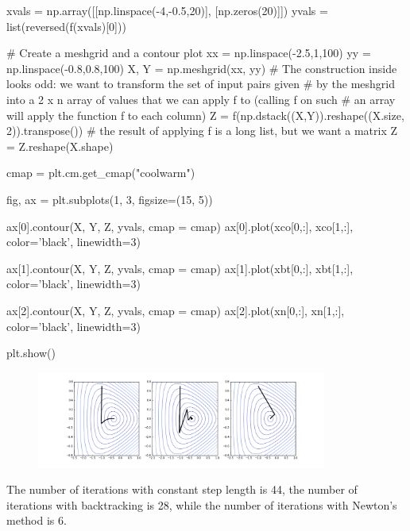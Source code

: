 \documentclass{article}
\begin{document}
\begin{ipythonnb}
xvals = np.array([[np.linspace(-4,-0.5,20)], [np.zeros(20)]])
yvals = list(reversed(f(xvals)[0]))

# Create a meshgrid and a contour plot
xx = np.linspace(-2.5,1,100)
yy = np.linspace(-0.8,0.8,100)
X, Y = np.meshgrid(xx, yy)
# The construction inside looks odd: we want to transform the set of input pairs given
# by the meshgrid into a 2 x n array of values that we can apply f to (calling f on such
# an array will apply the function f to each column)
Z = f(np.dstack((X,Y)).reshape((X.size, 2)).transpose())
# the result of applying f is a long list, but we want a matrix
Z = Z.reshape(X.shape)

cmap = plt.cm.get_cmap("coolwarm")

fig, ax = plt.subplots(1, 3, figsize=(15, 5))

ax[0].contour(X, Y, Z, yvals, cmap = cmap)
ax[0].plot(xco[0,:], xco[1,:], color='black', linewidth=3)

ax[1].contour(X, Y, Z, yvals, cmap = cmap)
ax[1].plot(xbt[0,:], xbt[1,:], color='black', linewidth=3)

ax[2].contour(X, Y, Z, yvals, cmap = cmap)
ax[2].plot(xn[0,:], xn[1,:], color='black', linewidth=3)

plt.show()
\end{ipythonnb}

\begin{figure}[h!]
 \centering
 \includegraphics[width=0.85\textwidth]{images/threemethods.png}
\end{figure}

The number of iterations with constant step length is 44, the number of iterations with backtracking is 28, while the number of iterations with Newton's method is 6.
\end{document}
